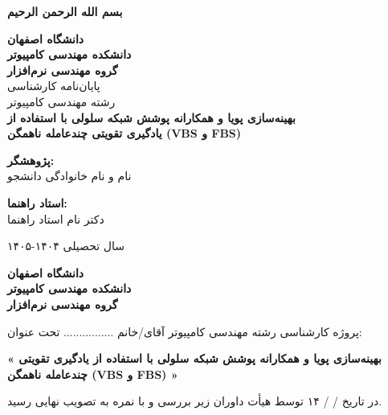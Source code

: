 \documentclass[a4paper,12pt,oneside]{report}
\begin{document}
\pagestyle{empty}

\begin{center}
    \vspace*{5cm}
    {\Huge \textbf{بسم الله الرحمن الرحیم}}
\end{center}
\newpage

\begin{center}
    \textbf{\Large دانشگاه اصفهان}\\[0.4cm]
    \textbf{\large دانشکده مهندسی کامپیوتر}\\[0.3cm]
    \textbf{\large گروه مهندسی نرم‌افزار}\\[2.5cm]

    {\large پایان‌نامه کارشناسی}\\[0.3cm]
    {\large رشته‌ مهندسی کامپیوتر}\\[1.5cm]

    {\LARGE \textbf{بهینه‌سازی پویا و همکارانه پوشش شبکه سلولی با استفاده از}}\\[0.4cm]
    {\LARGE \textbf{یادگیری تقویتی چندعامله ناهمگن (VBS و FBS)}}\\[3cm]

    \begin{minipage}{0.45\textwidth}
        \raggedright
        \textbf{پژوهشگر:}\\
        نام و نام خانوادگی دانشجو
    \end{minipage}
    \hfill
    \begin{minipage}{0.45\textwidth}
        \raggedleft
        \textbf{استاد راهنما:}\\
        دکتر نام استاد راهنما
    \end{minipage}

    \vfill
    {\large سال تحصیلی ۱۴۰۴-۱۴۰۵}
\end{center}
\newpage

\begin{center}
    \textbf{\large دانشگاه اصفهان}\\[0.3cm]
    \textbf{\large دانشکده مهندسی کامپیوتر}\\[0.3cm]
    \textbf{\large گروه مهندسی نرم‌افزار}\\[1.8cm]
\end{center}

\noindent
پروژه کارشناسی رشته‌ مهندسی کامپیوتر آقای/خانم ................ تحت عنوان:
\begin{center}
    \vspace{0.4cm}
    \textbf{« بهینه‌سازی پویا و همکارانه پوشش شبکه سلولی با استفاده از یادگیری تقویتی چندعامله ناهمگن (VBS و FBS) »}
    \vspace{0.4cm}
\end{center}
\noindent
در تاریخ \quad / \quad / \quad ۱۴ \quad توسط هیأت داوران زیر بررسی و با نمره \qquad به تصویب نهایی رسید.\\[1.5cm]
\end{document}
